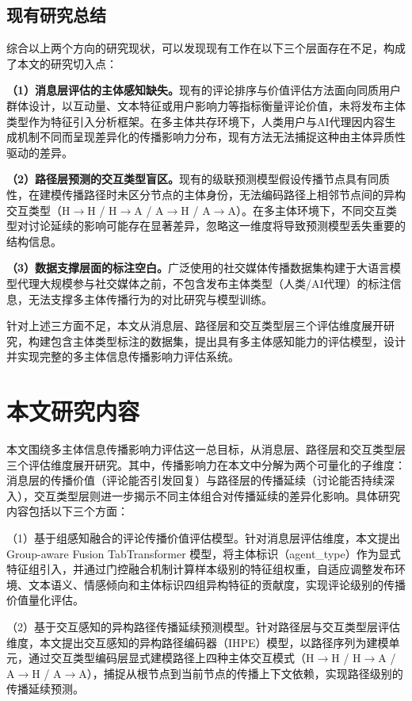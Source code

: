 \subsection{现有研究总结}

综合以上两个方向的研究现状，可以发现现有工作在以下三个层面存在不足，构成了本文的研究切入点：

\textbf{（1）消息层评估的主体感知缺失。}现有的评论排序与价值评估方法\cite{hsu2009ranking,glenski2017predicting}面向同质用户群体设计，以互动量、文本特征或用户影响力等指标衡量评论价值，未将发布主体类型作为特征引入分析框架。在多主体共存环境下，人类用户与AI代理因内容生成机制不同而呈现差异化的传播影响力分布，现有方法无法捕捉这种由主体异质性驱动的差异。

\textbf{（2）路径层预测的交互类型盲区。}现有的级联预测模型\cite{li2017deepcas,cao2017deephawkes,zhou2021casflow}假设传播节点具有同质性，在建模传播路径时未区分节点的主体身份，无法编码路径上相邻节点间的异构交互类型（H$\to$H / H$\to$A / A$\to$H / A$\to$A）。在多主体环境下，不同交互类型对讨论延续的影响可能存在显著差异，忽略这一维度将导致预测模型丢失重要的结构信息。

\textbf{（3）数据支撑层面的标注空白。}广泛使用的社交媒体传播数据集\cite{ma2016detecting,ma2017detect}构建于大语言模型代理大规模参与社交媒体之前，不包含发布主体类型（人类/AI代理）的标注信息，无法支撑多主体传播行为的对比研究与模型训练。

针对上述三方面不足，本文从消息层、路径层和交互类型层三个评估维度展开研究，构建包含主体类型标注的数据集，提出具有多主体感知能力的评估模型，设计并实现完整的多主体信息传播影响力评估系统。

\section{本文研究内容}

本文围绕多主体信息传播影响力评估这一总目标，从消息层、路径层和交互类型层三个评估维度展开研究。其中，传播影响力在本文中分解为两个可量化的子维度：消息层的传播价值（评论能否引发回复）与路径层的传播延续（讨论能否持续深入），交互类型层则进一步揭示不同主体组合对传播延续的差异化影响。具体研究内容包括以下三个方面：

（1）基于组感知融合的评论传播价值评估模型。针对消息层评估维度，本文提出 Group-aware Fusion TabTransformer 模型，将主体标识（agent\_type）作为显式特征组引入，并通过门控融合机制计算样本级别的特征组权重，自适应调整发布环境、文本语义、情感倾向和主体标识四组异构特征的贡献度，实现评论级别的传播价值量化评估。

（2）基于交互感知的异构路径传播延续预测模型。针对路径层与交互类型层评估维度，本文提出交互感知的异构路径编码器（IHPE）模型，以路径序列为建模单元，通过交互类型编码层显式建模路径上四种主体交互模式（H$\to$H / H$\to$A / A$\to$H / A$\to$A），捕捉从根节点到当前节点的传播上下文依赖，实现路径级别的传播延续预测。

